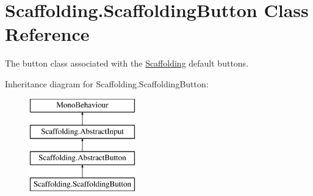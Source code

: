 \hypertarget{class_scaffolding_1_1_scaffolding_button}{\section{Scaffolding.\+Scaffolding\+Button Class Reference}
\label{class_scaffolding_1_1_scaffolding_button}
}


The button class associated with the \hyperlink{namespace_scaffolding}{Scaffolding} default buttons.  


Inheritance diagram for Scaffolding.\+Scaffolding\+Button\+:\begin{figure}[H]
\begin{center}
\leavevmode
\includegraphics[height=4.000000cm]{class_scaffolding_1_1_scaffolding_button}
\end{center}
\end{figure}
